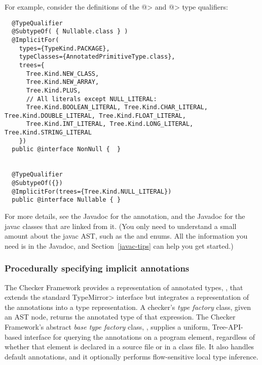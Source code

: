 For example, consider the definitions of the \<@> and \<@>
type qualifiers:

\begin{smaller}
\begin{Verbatim}
  @TypeQualifier
  @SubtypeOf( { Nullable.class } )
  @ImplicitFor(
    types={TypeKind.PACKAGE},
    typeClasses={AnnotatedPrimitiveType.class},
    trees={
      Tree.Kind.NEW_CLASS,
      Tree.Kind.NEW_ARRAY,
      Tree.Kind.PLUS,
      // All literals except NULL_LITERAL:
      Tree.Kind.BOOLEAN_LITERAL, Tree.Kind.CHAR_LITERAL, Tree.Kind.DOUBLE_LITERAL, Tree.Kind.FLOAT_LITERAL,
      Tree.Kind.INT_LITERAL, Tree.Kind.LONG_LITERAL, Tree.Kind.STRING_LITERAL
    })
  public @interface NonNull {  }


  @TypeQualifier
  @SubtypeOf({})
  @ImplicitFor(trees={Tree.Kind.NULL_LITERAL})
  public @interface Nullable { }
\end{Verbatim}
\end{smaller}

For more details, see the Javadoc for the 
  annotation, and the Javadoc for the javac classes that are linked from
it.  (You only need to understand a small amount about the javac AST, such
as the
and
enums.  All the information you need is in the Javadoc, and
Section~\ref{javac-tips} can help you get started.)


\subsubsection{Procedurally specifying implicit annotations}


The Checker Framework provides a representation of annotated types,
, that extends the standard \<TypeMirror>
interface but integrates a representation of the annotations into a
type representation.  A checker's \emph{type factory} class, given an AST
node, returns the annotated type of that expression.  The Checker
Framework's abstract
\emph{base type factory} class, ,
supplies a uniform, Tree-API-based interface
for querying the annotations on a program element, regardless of
whether that element is declared in a source file or in a class file.
It also handles default annotations, and it optionally performs
flow-sensitive local type inference.

